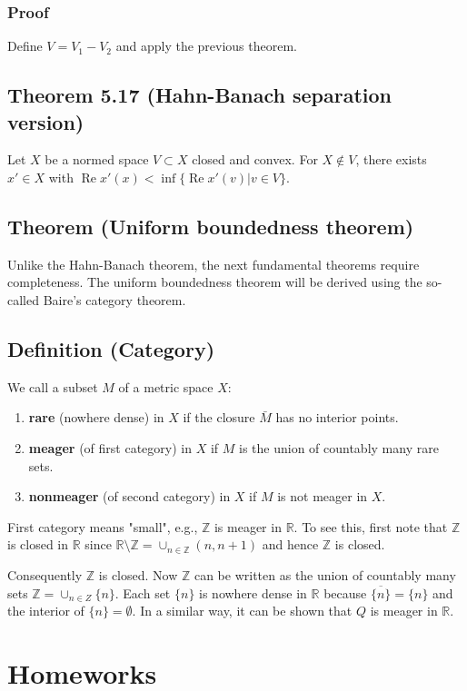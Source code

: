\documentclass[11pt]{article}
\def\R{\mathbb{R}}
\def\Re{\operatorname{Re}}
\def\Z{\mathbb{Z}}
\begin{document}
\subsubsection{Proof}
\label{sec:org9a3600f}
Define \(V= V_1 - V_2\) and apply the previous theorem.
\subsection{Theorem 5.17 (Hahn-Banach separation version)}
\label{sec:org8231e61}
Let \(X\) be a normed space \(V \subset X\) closed and convex. For \(X \notin V\),
there exists \(x' \in X\) with \(\Re x'(x) < \inf \{\Re x'(v) \vert v \in V\}\).
\subsection{Theorem (Uniform boundedness theorem)}
\label{sec:orgc1bacd9}
Unlike the Hahn-Banach theorem, the next fundamental theorems require
completeness. The uniform boundedness theorem will be derived using the
so-called Baire's category theorem.
\subsection{Definition (Category)}
\label{sec:org9ca2e29}
We call a subset \(M\) of a metric space \(X\):
\begin{enumerate}
\item \textbf{rare} (nowhere dense) in \(X\) if the closure \(\bar{M}\) has no interior
points.
\item \textbf{meager} (of first category) in \(X\) if \(M\) is the union of countably many
rare sets.
\item \textbf{nonmeager} (of second category) in \(X\) if \(M\) is not meager in \(X\).
\end{enumerate}

First category means "small", e.g., \(\Z\) is meager in \(\R\). To see this,
first note that \(\Z\) is closed in \(\R\) since \(\R \setminus \Z = \cup_{n \in
   \Z} (n, n+1)\) and hence \(\Z\) is closed.

Consequently \(\Z\) is closed. Now \(\Z\) can be written as the union of
countably many sets \(\Z = \cup_{n \in Z} \{n\}\). Each set \(\{n\}\) is nowhere
dense in \(\R\) because \(\overline{\{n\}} = \{n\}\) and the interior of \(\{n\} =
   \emptyset\). In a similar way, it can be shown that \(Q\) is meager in \(\R\).
\section{Homeworks}
\label{sec:org0e5bdca}
\end{document}
